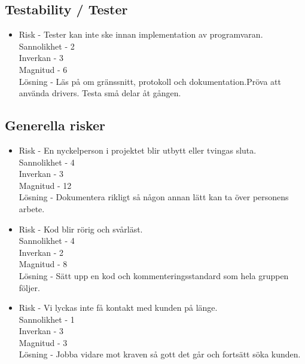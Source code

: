 \subsection{Testability / Tester}
\begin{itemize}
\item Risk - Tester kan inte ske innan implementation av programvaran.
\\Sannolikhet - 2
\\Inverkan - 3
\\Magnitud - 6
\\Lösning - Läs på om gränssnitt, protokoll och dokumentation.Pröva att använda drivers. Testa små delar åt gången.
\end{itemize}

\subsection{Generella risker}
\begin{itemize}
\item Risk - En nyckelperson i projektet blir utbytt eller tvingas sluta.
\\Sannolikhet - 4
\\Inverkan - 3
\\Magnitud - 12
\\Lösning - Dokumentera rikligt så någon annan lätt kan ta över personens arbete.
\item Risk - Kod blir rörig och svårläst.
\\Sannolikhet - 4
\\Inverkan - 2
\\Magnitud - 8
\\Lösning - Sätt upp en kod och kommenteringsstandard som hela gruppen följer.
\item Risk - Vi lyckas inte få kontakt med kunden på länge.
\\Sannolikhet - 1
\\Inverkan - 3
\\Magnitud - 3
\\Lösning - Jobba vidare mot kraven så gott det går och fortsätt söka kunden.
\end{itemize}



